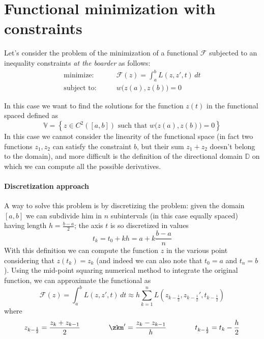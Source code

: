 \section{Functional minimization with constraints}
Let's consider the problem of the minimization of a functional $\mathcal F$ subjected to an inequality constraints \textit{at the boarder} as follows:
\begin{equation} \label{eq:func:origconst}
	\begin{aligned} 
		\textrm{minimize:}& \qquad \mathcal F(z) = \int_a^b L (z,z',t)\, dt \\
		\textrm{subject to:}& \qquad w\big(z(a),z(b) \big) = 0
	\end{aligned}
\end{equation}

In this case we want to find the solutions for the function $z(t)$ in the functional spaced defined as
\[\mathds V = \left\{ z \in C^2([a,b]) \textrm{ such that } w\big(z(a),z(b)\big) = 0 \right\}  \]
In this case we cannot consider the linearity of the functional space (in fact two functions $z_1,z_2$ can satisfy the constraint $b$, but their sum $z_1 + z_2$ doesn't belong to the domain), and more difficult is the definition of the directional domain $\mathds D$ on which we can compute all the possible derivatives. 

\paragraph{Discretization approach} A way to solve this problem is by discretizing the problem: given the domain $[a,b]$ we can subdivide him in $n$ subintervals (in this case equally spaced) having length $h = \frac{b-a}{2}$; the axis $t$ is so discretized in values
\[ t_k = t_0 + k h = a + k \frac {b-a}n  \]
With this definition we can compute the function $z$ in the various point considering that $z(t_k)=z_k$ (and indeed we can also note that $t_0 = a$ and $t_n = b$). Using the mid-point squaring numerical method to integrate the original function, we can approximate the functional as
\[ \mathcal F(z) = \int_a^b L (z,z',t)\, dt \approx h \sum_{k=1}^{n} L  \left( z_{k-\frac 1 2}, z_{k-\frac 1 2}', t_{k-\frac 1 2} \right) \]
where 
\[ z_{k-\frac 12} = \frac{z_k + z_{k-1}}{2} \qquad \qquad \zkm ' = \frac{z_k - z_{k-1}}{h} \qquad \qquad t_{k-\frac 12} = t_k - \frac h 2 \]

